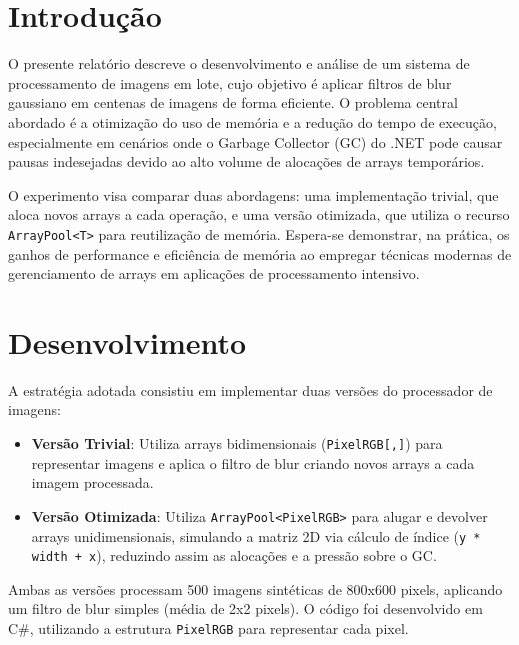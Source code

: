 \documentclass[
	12pt,
	oneside,
	a4paper,
	english,
	brazil,
	]{abntex2}
\begin{document}
\frenchspacing

\imprimircapa

{
\ABNTEXchapterfont

\textual

\section{Introdução}

O presente relatório descreve o desenvolvimento e análise de um sistema de processamento de imagens em lote, cujo objetivo é aplicar filtros de blur gaussiano em centenas de imagens de forma eficiente. O problema central abordado é a otimização do uso de memória e a redução do tempo de execução, especialmente em cenários onde o Garbage Collector (GC) do .NET pode causar pausas indesejadas devido ao alto volume de alocações de arrays temporários.

O experimento visa comparar duas abordagens: uma implementação trivial, que aloca novos arrays a cada operação, e uma versão otimizada, que utiliza o recurso \texttt{ArrayPool<T>} para reutilização de memória. Espera-se demonstrar, na prática, os ganhos de performance e eficiência de memória ao empregar técnicas modernas de gerenciamento de arrays em aplicações de processamento intensivo.

\section{Desenvolvimento}

A estratégia adotada consistiu em implementar duas versões do processador de imagens:

\begin{itemize}
    \item \textbf{Versão Trivial}: Utiliza arrays bidimensionais (\texttt{PixelRGB[,]}) para representar imagens e aplica o filtro de blur criando novos arrays a cada imagem processada.
    \item \textbf{Versão Otimizada}: Utiliza \texttt{ArrayPool<PixelRGB>} para alugar e devolver arrays unidimensionais, simulando a matriz 2D via cálculo de índice (\texttt{y * width + x}), reduzindo assim as alocações e a pressão sobre o GC.
\end{itemize}

Ambas as versões processam 500 imagens sintéticas de 800x600 pixels, aplicando um filtro de blur simples (média de 2x2 pixels). O código foi desenvolvido em C#, utilizando a estrutura \texttt{PixelRGB} para representar cada pixel.

}
\end{document}
